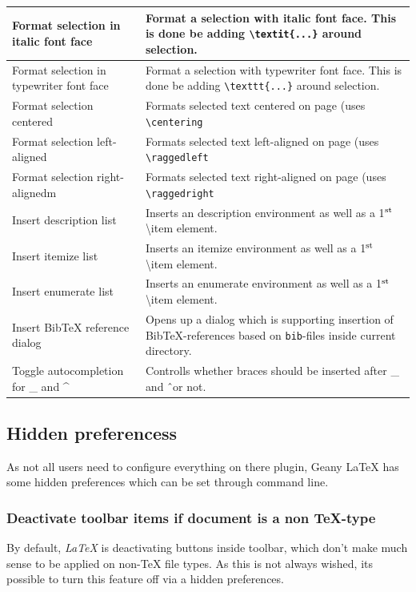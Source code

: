 \documentclass[%
paper=a4,%
fontsize=11pt,%
twoside=false,%
DIV18,%
headsepline,%
plainheadsepline,%
footsepline,%
plainfootsepline,%
bibliography=totoc,%
listof=totoc,%
BCOR10mm,%
parskip=half,%
openany,%
]{scrartcl}
\newcommand{\up}[1]{\ensuremath{^\textrm{\scriptsize#1}}}
\begin{document}
\begin{table}[H]
\begin{tabular}{l|p{9cm}}
Format selection in italic font face & Format a selection with italic font face.
This is done be adding \texttt{\textbackslash textit\{...\}} around selection.\\\hline
Format selection in typewriter font face & Format a selection with typewriter
font face. This is done be adding \texttt{\textbackslash texttt\{...\}} around
selection.\\\hline
Format selection centered & Formats selected text centered on page (uses \texttt{\textbackslash{}centering} \\\hline
Format selection left-aligned & Formats selected text left-aligned on page (uses \texttt{\textbackslash{}raggedleft} \\\hline
Format selection right-alignedm & Formats selected text right-aligned on page (uses \texttt{\textbackslash{}raggedright}\\\hline
Insert description list & Inserts an description environment as well as a 1\up{st} \textbackslash{}item element.\\\hline
Insert itemize list & Inserts an itemize environment as well as a 1\up{st} \textbackslash{}item element.\\\hline
Insert enumerate list & Inserts an enumerate environment as well as a 1\up{st} \textbackslash{}item element.\\\hline
Insert BibTeX reference dialog & Opens up a dialog which is supporting insertion of BibTeX-references based on \texttt{bib}-files inside current directory.\\\hline
Toggle autocompletion for \_ and \^ & Controlls whether braces should be inserted after \_ and \^ \ or not.
\end{tabular}
\end{table}


\subsection{Hidden preferencess}
\label{sec:hidden_preferences}
As not all users need to configure everything on there plugin, Geany
\LaTeX{} has some hidden preferences which can be set through
command line.

\subsubsection{Deactivate toolbar items if document is a non \TeX-type}
\label{deactivate_toolbaritems_with_non_latex}
By default, \textit{LaTeX} is deactivating buttons inside toolbar, which
don't make much sense to be applied on non-\TeX{} file types. As
this is not always wished, its possible to turn this feature off
via a hidden preferences.
\end{document}
